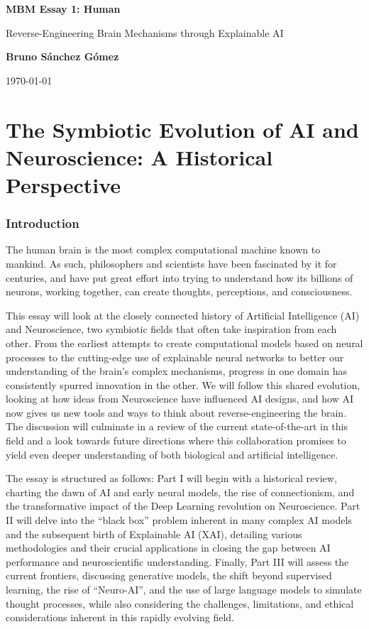 \documentclass[11pt,a4paper]{article}
\author{Bruno Sánchez Gómez}
\date{\today}
\begin{document}
\begin{titlepage}
    \centering
    \vspace*{2cm}
    {\Huge \bfseries MBM Essay 1: Human \par}
    \vspace{2cm}
    {\Large {\Huge Reverse-Engineering Brain Mechanisms through Explainable AI} \par}
    \vspace{8cm}
    {\large \textbf{Bruno Sánchez Gómez} \par}
    \vfill
    {\large \today \par}
\end{titlepage}


\part{The Symbiotic Evolution of AI and Neuroscience: A Historical Perspective}

\section{Introduction}

The human brain is the most complex computational machine known to mankind. As such, philosophers and scientists have been fascinated by it for centuries, and have put great effort into trying to understand how its billions of neurons, working together, can create thoughts, perceptions, and consciousness.

This essay will look at the closely connected history of Artificial Intelligence (AI) and Neuroscience, two symbiotic fields that often take inspiration from each other. From the earliest attempts to create computational models based on neural processes to the cutting-edge use of explainable neural networks to better our understanding of the brain's complex mechanisms, progress in one domain has consistently spurred innovation in the other. We will follow this shared evolution, looking at how ideas from Neuroscience have influenced AI designs, and how AI now gives us new tools and ways to think about reverse-engineering the brain. The discussion will culminate in a review of the current state-of-the-art in this field and a look towards future directions where this collaboration promises to yield even deeper understanding of both biological and artificial intelligence.

The essay is structured as follows: Part I will begin with a historical review, charting the dawn of AI and early neural models, the rise of connectionism, and the transformative impact of the Deep Learning revolution on Neuroscience. Part II will delve into the ``black box'' problem inherent in many complex AI models and the subsequent birth of Explainable AI (XAI), detailing various methodologies and their crucial applications in closing the gap between AI performance and neuroscientific understanding. Finally, Part III will assess the current frontiers, discussing generative models, the shift beyond supervised learning, the rise of ``Neuro-AI'', and the use of large language models to simulate thought processes, while also considering the challenges, limitations, and ethical considerations inherent in this rapidly evolving field.
\end{document}
